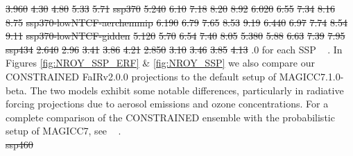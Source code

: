 \documentclass[gmd, manuscript]{copernicus}
\providecommand{\DIFadd}[1]{{\protect\color{blue}#1}} %
\providecommand{\DIFdel}[1]{{\protect\color{red}\sout{#1}}}                      %
\providecommand{\DIFaddbegin}{} %
\providecommand{\DIFaddend}{} %
\providecommand{\DIFdelbegin}{} %
\providecommand{\DIFdelend}{} %
\begin{document}
\DIFdel{3.960 }%
\DIFdel{4.30 }%
\DIFdel{4.80 }%
\DIFdel{5.33 }%
\DIFdel{5.71 }%
\DIFdel{ssp370                    }%
\DIFdel{5.240 }%
\DIFdel{6.10 }%
\DIFdel{7.18 }%
\DIFdel{8.20 }%
\DIFdel{8.92 }%
\DIFdel{6.020 }%
\DIFdel{6.55 }%
\DIFdel{7.34 }%
\DIFdel{8.16 }%
\DIFdel{8.75 }%
\DIFdel{ssp370-lowNTCF-aerchemmip }%
\DIFdel{6.190 }%
\DIFdel{6.79 }%
\DIFdel{7.65 }%
\DIFdel{8.53 }%
\DIFdel{9.19 }%
\DIFdel{6.440 }%
\DIFdel{6.97 }%
\DIFdel{7.74 }%
\DIFdel{8.54 }%
\DIFdel{9.11 }%
\DIFdel{ssp370-lowNTCF-gidden     }%
\DIFdel{5.120 }%
\DIFdel{5.70 }%
\DIFdel{6.54 }%
\DIFdel{7.40 }%
\DIFdel{8.05 }%
\DIFdel{5.380 }%
\DIFdel{5.88 }%
\DIFdel{6.63 }%
\DIFdel{7.39 }%
\DIFdel{7.95 }%
\DIFdel{ssp434                    }%
\DIFdel{2.640 }%
\DIFdel{2.96 }%
\DIFdel{3.41 }%
\DIFdel{3.86 }%
\DIFdel{4.21 }%
\DIFdel{2.850 }%
\DIFdel{3.10 }%
\DIFdel{3.46 }%
\DIFdel{3.85 }%
\DIFdel{4.13 }\DIFdelend \DIFaddbegin \DIFadd{.0 for each SSP \mbox{%
\citep{Riahi2017}}\hspace{0pt}%
. In Figures \ref{fig:NROY_SSP_ERF} \& \ref{fig:NROY_SSP} we also compare our CONSTRAINED FaIRv2.0.0 projections to the default setup of MAGICC7.1.0-beta. The two models exhibit some notable differences, particularly in radiative forcing projections due to aerosol emissions and ozone concentrations. For a complete comparison of the CONSTRAINED ensemble with the probabilistic setup of MAGICC7, see \mbox{%
\cite{Nicholls2021}}\hspace{0pt}%
. }\DIFaddend \\\DIFdelbegin \DIFdel{ssp460                    }%
\end{document}
